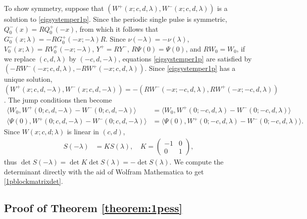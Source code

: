\documentclass[12pt]{elsarticle}
\theoremstyle{plain}
\theoremstyle{definition}
\theoremstyle{remark}
\numberwithin{theorem}{section}
\numberwithin{equation}{section}
\begin{document}
To show symmetry, suppose that $(W^+(x; c, d, \lambda), W^-(x; c, d, \lambda))$ is a solution to \cref{eigsystemper1p}. Since the periodic single pulse is symmetric, $Q_0^-(x) = R Q_0^+(-x)$, from which it follows that $G_0^-(x; \lambda) = -R G_0^+(-x; -\lambda)R$. Since $\nu(-\lambda) = -\nu(\lambda)$, $V_0^-(x; \lambda) = R V_0^+(-x; -\lambda)$, $Y^+ = R Y^-$, $R \Psi(0) = \Psi(0)$, and $R W_0 = W_0$, if we replace $(c, d, \lambda)$ by $(-c, d, -\lambda)$, equations \cref{eigsystemper1p} are satisfied by $(-RW^-(-x; c, d, \lambda), -RW^+(-x; c, d, \lambda))$. Since \cref{eigsystemper1p} has a unique solution, $\left(W^+(x; c, d, -\lambda), W^-(x; c, d, -\lambda)\right)
= -\left(RW^-(-x; -c, d, \lambda), RW^+(-x; -c, d, \lambda)\right)$. The jump conditions then become
\begin{align*}
\langle W_0, W^+(0; c, d, -\lambda) - W^-(0; c, d, -\lambda) \rangle &= \langle W_0, W^+(0; -c, d, \lambda) - W^-(0; -c, d, \lambda) \rangle \\
\langle \Psi(0), W^+(0; c, d, -\lambda) - W^-(0; c, d, -\lambda) \rangle &= \langle \Psi(0), W^+(0; -c, d, \lambda) - W^-(0; -c, d, \lambda) \rangle .
\end{align*}
Since $W(x; c, d; \lambda)$ is linear in $(c, d)$,
\begin{align*}
S(-\lambda) &= K S(\lambda), \quad K = \begin{pmatrix}-1 & 0 \\ 0 & 1 \end{pmatrix},
\end{align*}
thus $\det S(-\lambda) = \det K \det S(\lambda) = -\det S(\lambda)$. We compute the determinant directly with the aid of Wolfram Mathematica to get \cref{1pblockmatrixdet}.

\subsection{Proof of Theorem \ref{theorem:1pess} }
\end{document}
